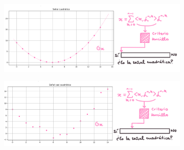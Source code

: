 \documentclass[]{beamer}
\theoremstyle{definition}
\begin{document}
\begin{frame}

\begin{figure}[H]
\centering
	\begin{figure}
		\includegraphics[scale= 0.7 ]{cuadr1}
 	\end{figure}
 \end{figure}

\begin{figure}[H]
\centering
	\begin{figure}
		\includegraphics[scale= 0.7]{cuadr2}
 	\end{figure}
 \end{figure}
\end{frame}
\end{document}
